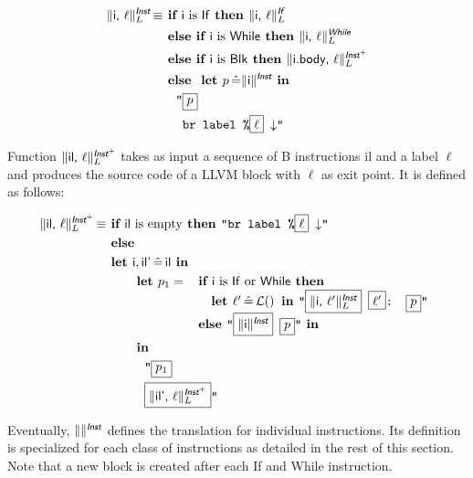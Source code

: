 \documentclass{llncs}
\newcommand{\trad}[2]{\ensuremath{\lVert \textsf{#1} \rVert^{\textit{#2}}}}
\newcommand{\nl}[0]{\ensuremath{\downarrow}}
\DeclareMathOperator{\isdef}{\equiv}
\DeclareMathOperator{\lbl}{\mathcal{L}()}
\newcommand{\llvm}[1]{\texttt{#1}}
\newcommand{\B}[1]{\textsf{#1}}
\newcommand{\ListOf}[1]{$\mbox{#1}^+$}
\newcommand{\IF}[0]{\textbf{ if }}
\newcommand{\ELSIF}[0]{\textbf{ else if }}
\newcommand{\ELSE}[0]{\textbf{ else }}
\newcommand{\THEN}[0]{\textbf{ then }}
\newcommand{\LET}[0]{\textbf{ let }}
\DeclareMathOperator{\BE}{\hat{=}}
\newcommand{\IN}[0]{\textbf{ in }}
\newcommand{\PH}[1]{\framebox{$#1$}}
\begin{document}
\begin{align*}
\trad{\B{i}, $\ell$}{\B{Inst}}_L \isdef
& \IF \B{i} \mbox{ is \B{If}} \THEN \trad{\B{i}, $\ell$}{\B{If}}_L \\
& \ELSIF \B{i} \mbox{ is \B{While}} \THEN \trad{\B{i}, $\ell$}{\B{While}}_L \\
& \ELSIF \B{i} \mbox{ is \B{Blk}} \THEN \trad{\B{i.body}, $\ell$}{\ListOf{\B{Inst}}}_L \\
& \ELSE \LET p \BE \trad{\B{i}}{\B{Inst}} \IN \\
& \quad \llvm{"\PH{p}} \\
& \quad \llvm{ br label \%\PH{\ell} \nl"}
\end{align*}

Function $\trad{\B{il}, $\ell$}{\ListOf{\B{Inst}}}_L$ takes as input a sequence
of B instructions \B{il} and a label $\ell$ and produces the source code of a
LLVM block with $\ell$ as exit point. It is defined as follows:

\begin{align*}
\trad{\B{il}, $\ell$}{\ListOf{\B{Inst}}}_L \isdef & \IF \B{il} \mbox{ is empty} \THEN \llvm{"br label \%\PH{\ell} \nl"} \\
& \ELSE \\
& \LET \B{i}, \B{il'} \BE \B{il}  \IN \\
& \quad \quad \LET p_1 =
\begin{array}[t]{l}
  \IF \B{i} \mbox{ is \B{If} or \B{While}} \THEN \\
  \quad \LET \ell' \BE \lbl \IN \llvm{"\PH{\trad{i, $\ell'$}{\B{Inst}}_L} \PH{\ell'}: \PH{p}"} \\
  \ELSE \llvm{"\PH{\trad{i}{\B{Inst}}} \PH{p}"} \IN
\end{array} \\
& \quad \quad \IN \\
& \quad \quad \quad \llvm{"\PH{p_1}} \\
& \quad \quad \quad \llvm{\PH{\trad{il', $\ell$}{\ListOf{\B{Inst}}}_L}"}
\end{align*}

Eventually, $\trad{}{\B{Inst}}$ defines the translation for individual
instructions. Its definition is specialized for each class of instructions as
detailed in the rest of this section. Note that a new block is created after
each \B{If} and \B{While} instruction.
\end{document}
